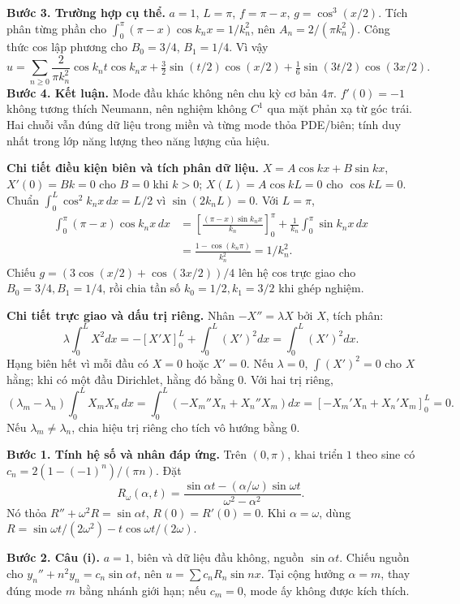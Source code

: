 \textbf{Bước 3. Trường hợp cụ thể.} $a=1$, $L=\pi$, $f=\pi-x$, $g=\cos^3(x/2)$. Tích phân từng phần cho $\int_0^\pi(\pi-x)\cos k_nx=1/k_n^2$, nên $A_n=2/(\pi k_n^2)$. Công thức cos lập phương cho $B_0=3/4$, $B_1=1/4$. Vì vậy
\[u=\sum_{n\ge0}\frac2{\pi k_n^2}\cos k_nt\cos k_nx
+\tfrac32\sin(t/2)\cos(x/2)+\tfrac16\sin(3t/2)\cos(3x/2).\]
\textbf{Bước 4. Kết luận.} Mode đầu khác không nên chu kỳ cơ bản $4\pi$. $f'(0)=-1$ không tương thích Neumann, nên nghiệm không $C^1$ qua mặt phản xạ từ góc trái. Hai chuỗi vẫn đúng dữ liệu trong miền và từng mode thỏa PDE/biên; tính duy nhất trong lớp năng lượng theo năng lượng của hiệu.

\textbf{Chi tiết điều kiện biên và tích phân dữ liệu.} $X=A\cos kx+B\sin kx$, $X'(0)=Bk=0$ cho $B=0$ khi $k>0$; $X(L)=A\cos kL=0$ cho $\cos kL=0$. Chuẩn $\int_0^L\cos^2k_nx\,dx=L/2$ vì $\sin(2k_nL)=0$. Với $L=\pi$,
\[\begin{aligned}
\int_0^\pi(\pi-x)\cos k_nx\,dx
&=\left[\frac{(\pi-x)\sin k_nx}{k_n}\right]_0^\pi
+\frac1{k_n}\int_0^\pi\sin k_nx\,dx\\
&=\frac{1-\cos(k_n\pi)}{k_n^2}=1/k_n^2.
\end{aligned}\]
Chiếu $g=(3\cos(x/2)+\cos(3x/2))/4$ lên hệ cos trực giao cho $B_0=3/4,B_1=1/4$, rồi chia tần số $k_0=1/2,k_1=3/2$ khi ghép nghiệm.

\textbf{Chi tiết trực giao và dấu trị riêng.} Nhân $-X''=\lambda X$ bởi $X$, tích phân:
\[\lambda\int_0^LX^2dx=-[X'X]_0^L+\int_0^L(X')^2dx=\int_0^L(X')^2dx.\]
Hạng biên hết vì mỗi đầu có $X=0$ hoặc $X'=0$. Nếu $\lambda=0$, $\int(X')^2=0$ cho $X$ hằng; khi có một đầu Dirichlet, hằng đó bằng $0$. Với hai trị riêng,
\[(\lambda_m-\lambda_n)\int_0^LX_mX_n\,dx
=\int_0^L(-X_m''X_n+X_n''X_m)dx
=[-X_m'X_n+X_n'X_m]_0^L=0.\]
Nếu $\lambda_m\ne\lambda_n$, chia hiệu trị riêng cho tích vô hướng bằng $0$.

\textbf{Bước 1. Tính hệ số và nhân đáp ứng.} Trên $(0,\pi)$, khai triển $1$ theo sine có $c_n=2(1-(-1)^n)/(\pi n)$. Đặt
\[R_\omega(\alpha,t)=\frac{\sin\alpha t-(\alpha/\omega)\sin\omega t}{\omega^2-\alpha^2}.\]
Nó thỏa $R''+\omega^2R=\sin\alpha t$, $R(0)=R'(0)=0$. Khi $\alpha=\omega$, dùng $R=\sin\omega t/(2\omega^2)-t\cos\omega t/(2\omega)$.

\textbf{Bước 2. Câu (i).} $a=1$, biên và dữ liệu đầu không, nguồn $\sin\alpha t$. Chiếu nguồn cho $y_n''+n^2y_n=c_n\sin\alpha t$, nên $u=\sum c_nR_n\sin nx$. Tại cộng hưởng $\alpha=m$, thay đúng mode $m$ bằng nhánh giới hạn; nếu $c_m=0$, mode ấy không được kích thích.

